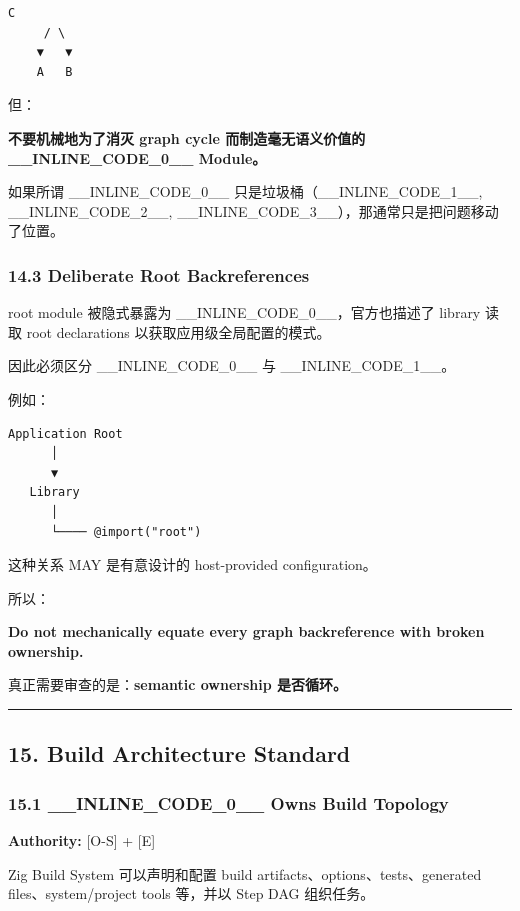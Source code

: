 \documentclass[11pt,a4paper]{article}
\begin{document}
\begin{lstlisting}[language=text]
      C
     / \
    ▼   ▼
    A   B
\end{lstlisting}
但：

\begin{gfmBlockquote}
\textbf{不要机械地为了消灭 graph cycle 而制造毫无语义价值的 \_\_INLINE\_CODE\_0\_\_ Module。}
\end{gfmBlockquote}
如果所谓 \_\_INLINE\_CODE\_0\_\_ 只是垃圾桶（\_\_INLINE\_CODE\_1\_\_, \_\_INLINE\_CODE\_2\_\_, \_\_INLINE\_CODE\_3\_\_），那通常只是把问题移动了位置。

\subsubsection{14.3 Deliberate Root Backreferences}
root module 被隐式暴露为 \_\_INLINE\_CODE\_0\_\_，官方也描述了 library 读取 root declarations 以获取应用级全局配置的模式。

因此必须区分 \_\_INLINE\_CODE\_0\_\_ 与 \_\_INLINE\_CODE\_1\_\_。

例如：

\begin{lstlisting}[language=text]
Application Root
      │
      ▼
   Library
      │
      └──── @import("root")
\end{lstlisting}
这种关系 MAY 是有意设计的 host-provided configuration。

所以：

\begin{gfmBlockquote}
\textbf{Do not mechanically equate every graph backreference with broken ownership.}
\end{gfmBlockquote}
真正需要审查的是：\textbf{semantic ownership 是否循环。}

\vspace{0.5em}\hrule\vspace{0.5em}
\subsection{15. Build Architecture Standard}
\subsubsection{15.1 \_\_INLINE\_CODE\_0\_\_ Owns Build Topology}
\textbf{Authority:} [O-S] + [E]

Zig Build System 可以声明和配置 build artifacts、options、tests、generated files、system/project tools 等，并以 Step DAG 组织任务。
\end{document}

